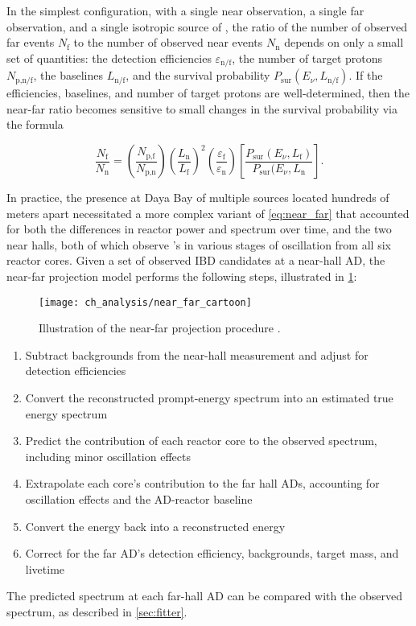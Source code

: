 In the simplest configuration, with a single near observation,
a single far observation, and a single isotropic source of \nuebar,
the ratio of the number of observed far events $N_\text{f}$
to the number of observed near events $N_\text{n}$
depends on only a small set of quantities:
the detection efficiencies $\varepsilon_\text{n/f}$,
the number of target protons $N_\text{p,n/f}$,
the baselines $L_\text{n/f}$,
and the survival probability $P_\text{sur}(E_\nu, L_\text{n/f})$.
If the efficiencies, baselines, and number of target protons are well-determined,
then the near-far ratio becomes sensitive
to small changes in the survival probability via the formula \cite{ngd2016}

\begin{equation}\label{eq:near_far}
    \frac{N_\text{f}}{N_\text{n}} = \left(\frac{N_\text{p,f}}{N_\text{p,n}}\right)
    \left(\frac{L_\text{n}}{L_\text{f}}\right)^2
    \left(\frac{\varepsilon_\text{f}}{\varepsilon_\text{n}}\right)
    \left[\frac{P_\text{sur}(E_\nu, L_\text{f})}{P_\text{sur}(E_\nu, L_\text{n}}\right].
\end{equation}

In practice, the presence at Daya Bay of multiple \nuebar{} sources
located hundreds of meters apart
necessitated a more complex variant of \cref{eq:near_far}
that accounted for both the differences in reactor power and \nuebar{} spectrum over time,
and the two near halls, both of which observe \nuebar{}'s
in various stages of oscillation from all six reactor cores.
Given a set of observed IBD candidates at a near-hall AD,
the near-far projection model performs the following steps,
illustrated in \cref{fig:near_far_cartoon}:

\begin{figure}
    \centering
    \texttt{[image: ch\_analysis/near\_far\_cartoon]}
    \caption[Diagram of near-to-far projection]{Illustration of the near-far projection procedure \cite{p12e_fitter}.}
    \label{fig:near_far_cartoon}
\end{figure}

\begin{enumerate}
    \item Subtract backgrounds from the near-hall measurement
        and adjust for detection efficiencies
    \item Convert the reconstructed prompt-energy spectrum
        into an estimated true \nuebar{} energy spectrum
    \item Predict the contribution of each reactor core
        to the observed \nuebar{} spectrum,
        including minor oscillation effects
    \item Extrapolate each core's contribution to the far hall ADs,
        accounting for oscillation effects and the AD-reactor baseline
    \item Convert the \nuebar{} energy back into a reconstructed energy
    \item Correct for the far AD's detection efficiency, backgrounds,
        target mass, and livetime
\end{enumerate}
The predicted spectrum at each far-hall AD can be compared
with the observed spectrum, as described in \cref{sec:fitter}.

